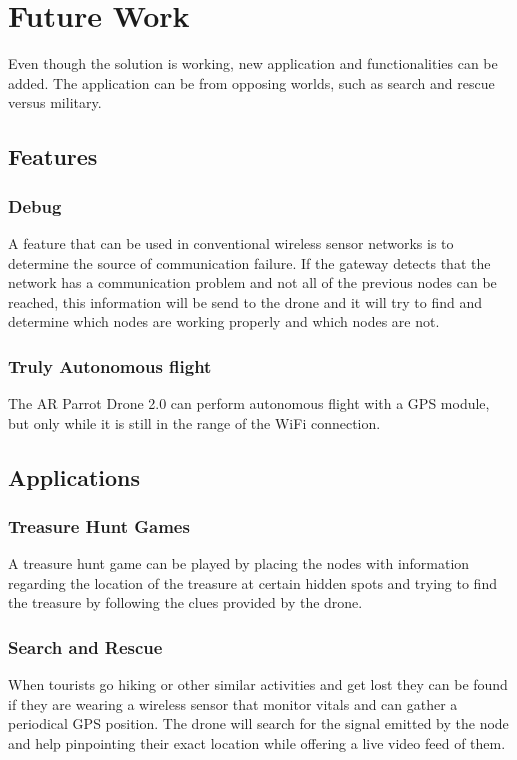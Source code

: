 \normalfont\normalsize
\chapter{Future Work}

Even though the solution is working, new application and functionalities can be added. The application can be from opposing worlds, such as search and rescue versus military.


\section{Features}

\subsection{Debug}

A feature that can be used in conventional wireless sensor networks is to determine the source of communication failure. If the gateway detects that the network has a communication problem and not all of the previous nodes can be reached, this information will be send to the drone and it will try to find and determine which nodes are working properly and which nodes are not.

\subsection{Truly Autonomous flight}
The AR Parrot Drone 2.0 can perform autonomous flight with a GPS module, but only while it is still in the range of the WiFi connection.

\section{Applications}

\subsection{Treasure Hunt Games}
A treasure hunt game can be played by placing the nodes with information regarding the location of the treasure at certain hidden spots and trying to find the treasure by following the clues provided by the drone.

\subsection{Search and Rescue}
When tourists go hiking or other similar activities and get lost they can be found if they are wearing a wireless sensor that monitor vitals and can gather a periodical GPS position. The drone will search for the signal emitted by the node and help pinpointing their exact location while offering a live video feed of them.

\clearpage
